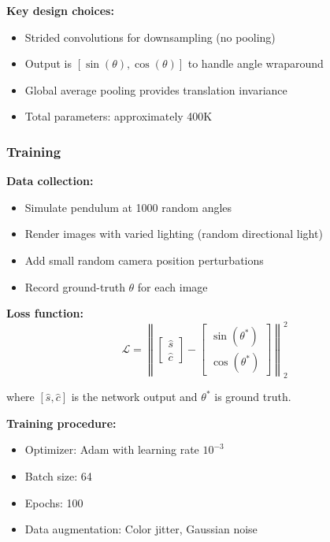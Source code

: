 \textbf{Key design choices:}
\begin{itemize}
    \item Strided convolutions for downsampling (no pooling)
    \item Output is $[\sin(\theta), \cos(\theta)]$ to handle angle wraparound
    \item Global average pooling provides translation invariance
    \item Total parameters: approximately 400K
\end{itemize}

\subsubsection{Training}

\textbf{Data collection:}
\begin{itemize}
    \item Simulate pendulum at 1000 random angles
    \item Render images with varied lighting (random directional light)
    \item Add small random camera position perturbations
    \item Record ground-truth $\theta$ for each image
\end{itemize}

\textbf{Loss function:}
\begin{equation}
\mathcal{L} = \left\| \begin{bmatrix} \hat{s} \\ \hat{c} \end{bmatrix} - \begin{bmatrix} \sin(\theta^*) \\ \cos(\theta^*) \end{bmatrix} \right\|_2^2
\label{eq:pendulum_loss}
\end{equation}

where $[\hat{s}, \hat{c}]$ is the network output and $\theta^*$ is ground truth.

\textbf{Training procedure:}
\begin{itemize}
    \item Optimizer: Adam with learning rate $10^{-3}$
    \item Batch size: 64
    \item Epochs: 100
    \item Data augmentation: Color jitter, Gaussian noise
\end{itemize}

